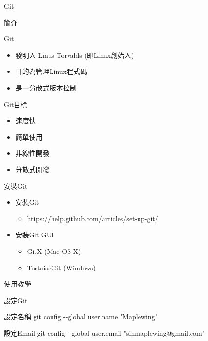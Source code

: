 \documentclass[pdf,16pt]{beamer}
\begin{document}
  \begin{section}{Git}
    \begin{subsection}{簡介}
      \begin{frame}{Git}
        \begin{itemize}
          \item 發明人 Linus Torvalds (即Linux創始人)
          \item 目的為管理Linux程式碼
          \item 是一分散式版本控制
        \end{itemize}
      \end{frame}
      
      \begin{frame}{Git目標}
        \begin{itemize}
          \item 速度快
          \item 簡單使用
          \item 非線性開發
          \item 分散式開發
        \end{itemize}
      \end{frame}
      
      \begin{frame}{安裝Git}
        \begin{itemize}
          \item 安裝Git
          \begin{itemize}
            \item \url{https://help.github.com/articles/set-up-git/}
          \end{itemize}
          \item 安裝Git GUI
          \begin{itemize}
            \item GitX (Mac OS X)
            \item TortoiseGit (Windows)
          \end{itemize}
        \end{itemize}
      \end{frame}
    \end{subsection}
    
    \begin{subsection}{使用教學}
      \begin{frame}{設定Git}
        \begin{block}{設定名稱}
          git config -\phantom{}-global user.name "Maplewing"
        \end{block}
        \begin{block}{設定Email}
          git config -\phantom{}-global user.email "sinmaplewing@gmail.com"
        \end{block}
      \end{frame}
      

\end{subsection}
\end{section}
\end{document}
